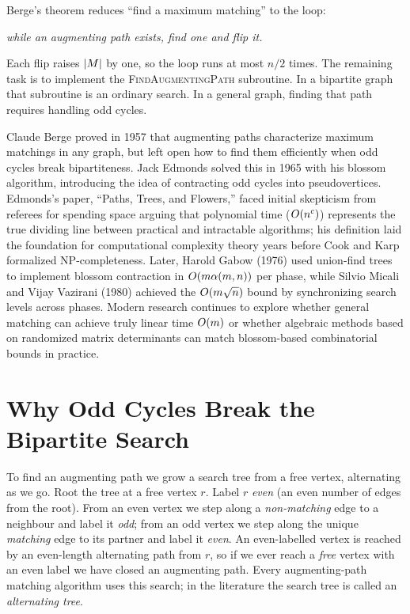 Berge's theorem reduces ``find a maximum matching'' to the loop:

\begin{center}
\emph{while an augmenting path exists, find one and flip it.}
\end{center}

Each flip raises $\lvert M\rvert$ by one, so the loop runs at most $n/2$ times. The remaining task is to implement the \textsc{FindAugmentingPath} subroutine. In a bipartite graph that subroutine is an ordinary search. In a general graph, finding that path requires handling odd cycles.

\begin{historybox}
Claude Berge proved in 1957 that augmenting paths characterize maximum matchings in any graph, but left open how to find them efficiently when odd cycles break bipartiteness. Jack Edmonds solved this in 1965 with his blossom algorithm, introducing the idea of contracting odd cycles into pseudovertices. Edmonds's paper, ``Paths, Trees, and Flowers,'' faced initial skepticism from referees for spending space arguing that polynomial time ($O(n^c)$) represents the true dividing line between practical and intractable algorithms; his definition laid the foundation for computational complexity theory years before Cook and Karp formalized NP-completeness. Later, Harold Gabow (1976) used union-find trees to implement blossom contraction in $O(m\alpha(m,n))$ per phase, while Silvio Micali and Vijay Vazirani (1980) achieved the $O(m\sqrt{n})$ bound by synchronizing search levels across phases. Modern research continues to explore whether general matching can achieve truly linear time $O(m)$ or whether algebraic methods based on randomized matrix determinants can match blossom-based combinatorial bounds in practice.
\end{historybox}

\section{Why Odd Cycles Break the Bipartite Search}

To find an augmenting path we grow a search tree from a free vertex, alternating as we go. Root the
tree at a free vertex $r$. Label $r$ \emph{even} (an even number of edges from the root). From an
even vertex we step along a \emph{non-matching} edge to a neighbour and label it \emph{odd}; from an
odd vertex we step along the unique \emph{matching} edge to its partner and label it \emph{even}. An
even-labelled vertex is reached by an even-length alternating path from $r$, so if we ever reach a
\emph{free} vertex with an even label we have closed an augmenting path. Every augmenting-path
matching algorithm uses this search; in the literature the search tree is called an \emph{alternating tree}.

